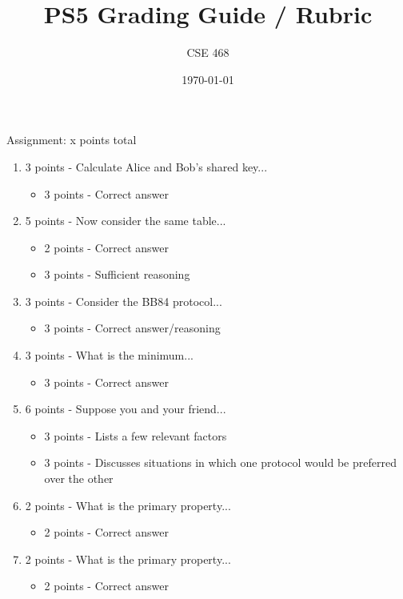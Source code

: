 \documentclass[12pt]{article}
\title{PS5 Grading Guide / Rubric}
\author{CSE 468}
\date{\today}
\begin{document}
\maketitle

Assignment: x points total
\begin{enumerate}[font=\bfseries]
    \item 3 points - Calculate Alice and Bob's shared key...
        \begin{itemize}
            \item 3 points - Correct answer
        \end{itemize}
    \item 5 points - Now consider the same table...
        \begin{itemize}
            \item 2 points - Correct answer
            \item 3 points - Sufficient reasoning
        \end{itemize}
    \item 3 points - Consider the BB84 protocol...
        \begin{itemize}
            \item 3 points - Correct answer/reasoning
        \end{itemize}
    \item 3 points - What is the minimum...
        \begin{itemize}
            \item 3 points - Correct answer
        \end{itemize}
    \item 6 points - Suppose you and your friend...
        \begin{itemize}
            \item 3 points - Lists a few relevant factors
            \item 3 points - Discusses situations in which one protocol would be preferred over the other
        \end{itemize}
    \item 2 points - What is the primary property...
        \begin{itemize}
            \item 2 points - Correct answer
        \end{itemize}
    \item 2 points - What is the primary property...
        \begin{itemize}
            \item 2 points - Correct answer

\end{itemize}
\end{enumerate}
\end{document}
